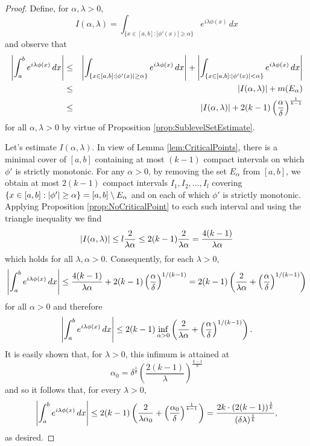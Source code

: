 \documentclass[11pt, letter]{book}
\newcommand{\lp}{\left(}
\newcommand{\rp}{\right)}
\newcommand{\f}[2]{\frac{#1}{#2}}
\newcommand{\al}{\alpha}
\begin{document}
\begin{proof}
Define, for $\alpha,\lambda>0$,
\begin{equation*}
    I(\alpha,\lambda)=\int_{\{x\in[a,b]:|\phi'(x)|\geq \alpha\}}e^{i\lambda\phi(x)}\,dx
\end{equation*}
and observe that
\begin{eqnarray*}
    \abs{\int_a^b e^{i\lambda \phi(x)} \,dx}
    &\leq&  \abs{\int_{\{x\in[a,b]:|\phi'(x)|\geq \alpha\}}e^{i\lambda\phi(x)}\,dx}
    + 
    \abs{\int_{\{ x\in [a,b]: \abs{\phi'(x)} < \al \}}e^{i\lambda \phi(x)} \,dx } \\
    &\leq& \abs{I(\alpha,\lambda)}  + m(E_\al)\\
    &\leq& \abs{I(\alpha,\lambda)} + 2(k-1)\lp\f{\al}{\delta}\rp^{\f{1}{k-1}}
\end{eqnarray*}
for all $\alpha,\lambda>0$ by virtue of Proposition \ref{prop:SublevelSetEstimate}. 

Let's estimate $I(\al,\lambda)$. In view of Lemma \ref{lem:CriticalPoints}, there is a minimal cover of $[a,b]$ containing at most $(k-1)$ compact intervals on which $\phi'$ is strictly monotonic. For any $\alpha>0$, by removing the set $E_\alpha$ from $[a,b]$, we obtain at most $2(k-1)$ compact intervals $I_1,I_2,\dots,I_l$ covering $\{ x\in [a,b] : \abs{\phi'} \geq\alpha \}=[a,b]\setminus E_\alpha$ and on each of which $\phi'$ is strictly monotonic. Applying Proposition \ref{prop:NoCriticalPoint} to each such interval and using the triangle inequality we find 
\begin{equation*}
    \abs{I(\alpha,\lambda)} \leq l\f{2}{\lambda\alpha} \leq 2(k-1)\frac{2}{\lambda\alpha}= \f{4(k-1)}{\lambda\alpha}
\end{equation*}
which holds for all $\lambda,\alpha>0$. Consequently, for each $\lambda>0$,
\begin{equation*}
    \abs{\int_a^be^{i\lambda\phi(x)}\,dx}\leq \frac{4(k-1)}{\lambda \alpha}+2(k-1)\left(\frac{\alpha}{\delta}\right)^{1/(k-1)}=2(k-1)\left(\frac{2}{\lambda\alpha}+\left(\frac{\alpha}{\delta}\right)^{1/(k-1)}\right)
\end{equation*}
for all $\alpha>0$ and therefore
\begin{equation*}
    \abs{\int_a^b e^{i\lambda\phi(x)}\,dx}\leq 2(k-1)\inf_{\alpha>0}\left(\frac{2}{\lambda\alpha}+\left(\frac{\alpha}{\delta}\right)^{1/(k-1)}\right).
\end{equation*}
It is easily shown that, for $\lambda>0$, this infimum is attained at
\begin{equation*}
    \al_0 = \delta^{\f{1}{k}} \left( \f{2(k-1)}{\lambda} \right)^{\f{k-1}{k}}
\end{equation*}
and so it follows that, for every $\lambda>0$,
\begin{equation*}
    \abs{\int_a^b e^{i\lambda \phi(x)} \,dx} \leq 2(k-1)\left( \f{2}{\lambda \alpha_0} +\left(  \f{\al_0}{\delta}\right)^{\f{1}{k-1}}   \right)=\f{2k\cdot (2(k-1))^{\f{1}{k}}}{(\delta\lambda)^{\f{1}{k}}},
\end{equation*}
as desired.


\end{proof}
\end{document}
